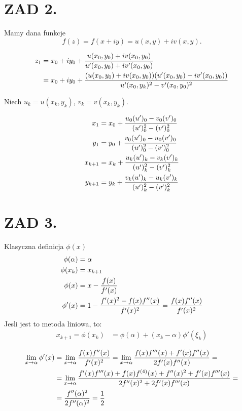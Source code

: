 \documentclass{article}[16pt]
\begin{document}
    \section*{ZAD 2.}

    Mamy dana funkcje
    $$f(z)=f(x+iy)=u(x,y)+iv(x,y).$$

    \begin{align*}
        z_1&=x_0+iy_0+{u(x_0,y_0)+iv(x_0,y_0)\over u'(x_0,y_0)+iv'(x_0,y_0)}\\
        &=x_0+iy_0+{(u(x_0,y_0)+iv(x_0,y_0))(u'(x_0,y_0)-iv'(x_0,y_0))\over u'(x_0,y_k)^2-v'(x_0,y_0)^2}
    \end{align*}
    
    Niech $u_k=u(x_k,y_k)$, $v_k=v(x_k,y_k)$.

    \begin{align*}
        x_{1}&=x_0+{u_0(u')_0-v_0(v')_0\over (u')_0^2-(v')_0^2}\\
        y_{1}&=y_0+{v_0(u')_0-u_0(v')_0\over (u')_0^2-(v')_0^2}\\
        x_{k+1}&=x_k+{u_k(u')_k-v_k(v')_k\over (u')_k^2-(v')_k^2}\\
        y_{k+1}&=y_k+{v_k(u')_k-u_k(v')_k\over (u')_k^2-(v')_k^2}
    \end{align*}

    \section*{ZAD 3.}

    Klasyczna definicja $\phi(x)$
    \begin{align*}
        \phi(\alpha)&=\alpha\\
        \phi(x_k)&=x_{k+1}\\
        \phi(x)&=x-{f(x)\over f'(x)}\\
        \phi'(x)&=1-{f'(x)^2-f(x)f''(x)\over f'(x)^2}={f(x)f''(x)\over f'(x)^2}
    \end{align*}
    Jesli jest to metoda liniowa, to:
    \begin{align*}
        x_{k+1}=\phi(x_k)&=\phi(\alpha)+(x_k-\alpha)\phi'(\xi_k)
    \end{align*}

    \begin{align*}
        \lim\limits_{x\to\alpha}\phi'(x)&=\lim\limits_{x\to\alpha}{f(x)f''(x)\over f'(x)^2}=\lim\limits_{x\to\alpha}{f(x)f'''(x)+f'(x)f''(x)\over 2f'(x)f''(x)}=\\
        &=\lim\limits_{x\to\alpha}{f'(x)f'''(x)+f(x)f^{(4)}(x)+f''(x)^2+f'(x)f'''(x)\over 2f''(x)^2+2f'(x)f'''(x)}=\\
        &={f''(\alpha)^2\over 2f''(\alpha)^2}=\frac12
    \end{align*}
\end{document}
